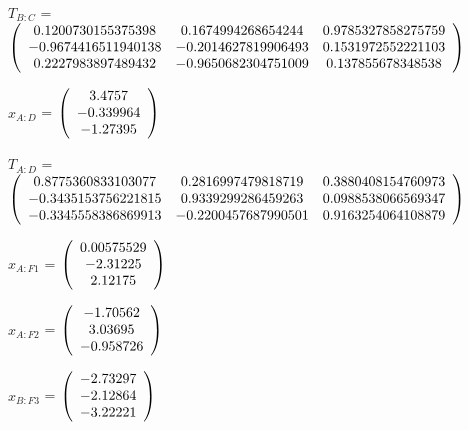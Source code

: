 \begin{description}
$T_{B:C}$ = $\left( \begin{array} {ccc} 
   0.1200730155375398 & 0.1674994268654244 & 0.9785327858275759 \\ 
   -0.9674416511940138 & -0.2014627819906493 & 0.1531972552221103 \\ 
   0.2227983897489432 & -0.9650682304751009 & 0.137855678348538 \\
\end{array} \right)\\ \\$

$x_{A:D}$ = $\left( \begin{array} {ccc}     3.4757 \\  -0.339964 \\   -1.27395 
\end{array} \right)\\ \\$

$T_{A:D}$ = $\left( \begin{array} {ccc} 
   0.8775360833103077 & 0.2816997479818719 & 0.3880408154760973 \\ 
   -0.3435153756221815 & 0.9339299286459263 & 0.0988538066569347 \\ 
   -0.3345558386869913 & -0.2200457687990501 & 0.9163254064108879 \\
\end{array} \right)\\ \\$

$x_{A:F1}$ = $\left( \begin{array} {ccc} 0.00575529 \\   -2.31225 \\    2.12175 
\end{array} \right)\\ \\$

$x_{A:F2}$ = $\left( \begin{array} {ccc}   -1.70562 \\    3.03695 \\  -0.958726 
\end{array} \right)\\ \\$

$x_{B:F3}$ = $\left( \begin{array} {ccc}   -2.73297 \\   -2.12864 \\   -3.22221 
\end{array} \right)\\ \\$


\end{description}

